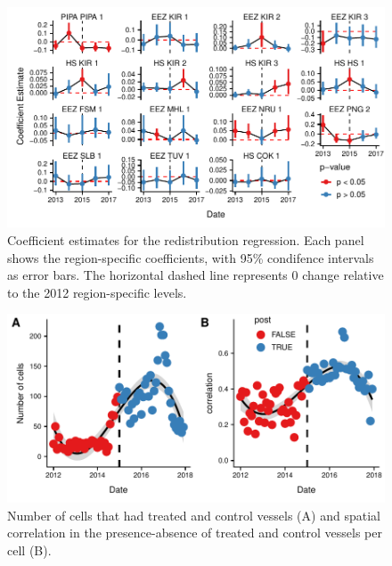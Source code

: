 \documentclass[11pt,english]{article}
\begin{document}
\begin{figure}
\centering
\includegraphics{img/mean_change.pdf}
\caption{\label{fig:mean_change}Coefficient
estimates for the redistribution regression. Each panel shows the
region-specific coefficients, with 95\% condifence intervals
as error bars. The horizontal dashed line represents 0 change
relative to the 2012 region-specific levels.}
\end{figure}

\clearpage
\begin{landscape}



\end{landscape}
\clearpage

\begin{figure}
\centering
\includegraphics{img/sp_corr.pdf}
\caption{\label{fig:sp_corr}Number of cells that
had treated and control vessels (A) and spatial correlation in the
presence-absence of treated and control vessels per cell (B).}
\end{figure}



\clearpage
\end{document}
